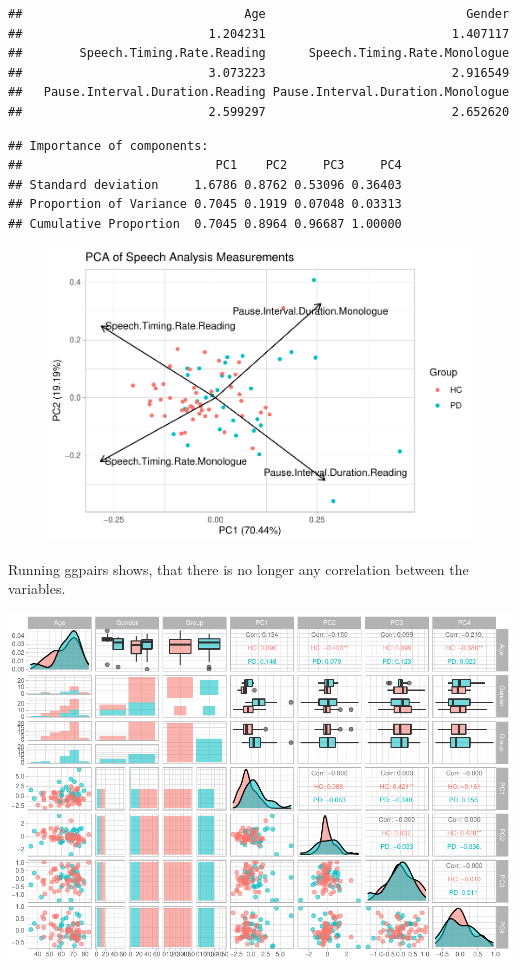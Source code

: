 \documentclass[
  english,
  doc,floatsintext]{apa6}
\begin{document}
\begin{verbatim}
##                               Age                            Gender 
##                          1.204231                          1.407117 
##        Speech.Timing.Rate.Reading      Speech.Timing.Rate.Monologue 
##                          3.073223                          2.916549 
##   Pause.Interval.Duration.Reading Pause.Interval.Duration.Monologue 
##                          2.599297                          2.652620
\end{verbatim}

\begin{verbatim}
## Importance of components:
##                           PC1    PC2     PC3     PC4
## Standard deviation     1.6786 0.8762 0.53096 0.36403
## Proportion of Variance 0.7045 0.1919 0.07048 0.03313
## Cumulative Proportion  0.7045 0.8964 0.96687 1.00000
\end{verbatim}

\begin{figure}

{\centering \includegraphics{dap_report_anja_probst_files/figure-latex/pca-loadings-1} 

}

\caption{ }\label{fig:pca-loadings}
\end{figure}

Running ggpairs shows, that there is no longer any correlation between the variables.

\includegraphics{dap_report_anja_probst_files/figure-latex/check for removal of correlations-1.pdf}
\end{document}
